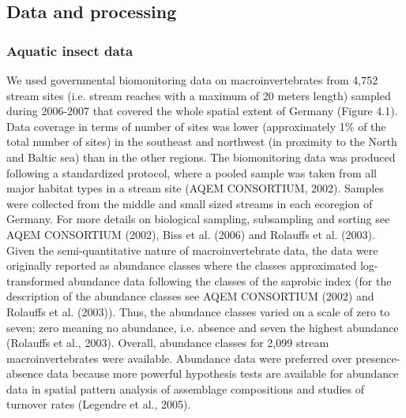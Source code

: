 \subsection{Data and processing}
\label{Data and processing}

\subsubsection{Aquatic insect data}
\label{Aquatic insect data}

We used governmental biomonitoring data on macroinvertebrates from 4,752 stream sites (i.e. stream reaches with a maximum of 20 meters length) sampled during 2006-2007 that covered the whole spatial extent of Germany (Figure 4.1). Data coverage in terms of number of sites was lower (approximately 1\% of the total number of sites) in the southeast and northwest (in proximity to the North and Baltic sea) than in the other regions. The biomonitoring data was produced following a standardized protocol, where a pooled sample was taken from all major habitat types in a stream site (AQEM CONSORTIUM, 2002). Samples were collected from the middle and small sized streams in each ecoregion of Germany. For more details on biological sampling, subsampling and sorting see AQEM CONSORTIUM (2002), Biss et al. (2006) and Rolauffs et al. (2003). Given the semi-quantitative nature of macroinvertebrate data, the data were originally reported as abundance classes where the classes approximated log-transformed abundance data following the classes of the saprobic index (for the description of the abundance classes see AQEM CONSORTIUM (2002) and Rolauffs et al. (2003)). Thus, the abundance classes varied on a scale of zero to seven; zero meaning no abundance, i.e. absence and seven the highest abundance (Rolauffs et al., 2003). Overall, abundance classes for 2,099 stream macroinvertebrates were available. Abundance data were preferred over presence-absence data because more powerful hypothesis tests are available for abundance data in spatial pattern analysis of assemblage compositions and studies of turnover rates (Legendre et al., 2005).

